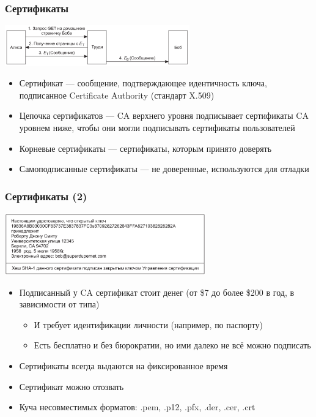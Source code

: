 \documentclass{../../slides-style}
\begin{document}
    \begin{frame}
        \frametitle{Сертификаты}
        \begin{center}
            \includegraphics[width=0.6\textwidth]{manInTheMiddle.png}
        \end{center}
        \begin{itemize}
            \item Сертификат --- сообщение, подтверждающее идентичность ключа, подписанное Certificate Authority (стандарт X.509)
            \item Цепочка сертификатов --- CA верхнего уровня подписывает сертификаты CA уровнем ниже, чтобы они могли подписывать сертификаты пользователей
            \item Корневые сертификаты --- сертификаты, которым принято доверять
            \item Самоподписанные сертификаты --- не доверенные, используются для отладки
        \end{itemize}
    \end{frame}

    \begin{frame}
        \frametitle{Сертификаты (2)}
        \begin{center}
            \includegraphics[width=0.65\textwidth]{certificate.png}
        \end{center}
        \begin{itemize}
            \item Подписанный у CA сертификат стоит денег (от \$7 до более \$200 в год, в зависимости от типа)
            \begin{itemize}
                \item И требует идентификации личности (например, по паспорту)
                \item Есть бесплатно и без бюрократии, но ими далеко не всё можно подписать
            \end{itemize}
            \item Сертификаты всегда выдаются на фиксированное время
            \item Сертификат можно отозвать
            \item Куча несовместимых форматов: .pem, .p12, .pfx, .der, .cer, .crt
        \end{itemize}
    \end{frame}
\end{document}
